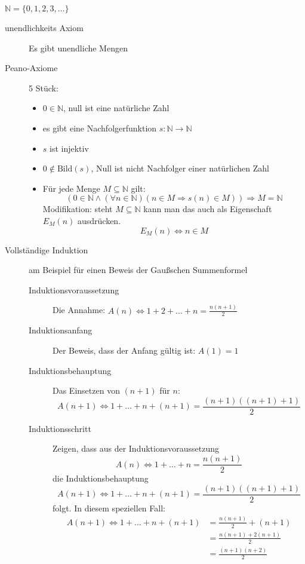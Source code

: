$\mathbb{N} = \lbrace 0, 1, 2, 3, \dots \rbrace$
\begin{description}
    \item[unendlichkeits Axiom] Es gibt unendliche Mengen
    \item[Peano-Axiome] 5 Stück:
    \begin{itemize}
        \item $0 \in \mathbb{N}$, null ist eine natürliche Zahl
        \item es gibt eine Nachfolgerfunktion $s : \mathbb{N} \longrightarrow \mathbb{N}$
        \item $s$ ist injektiv
        \item $0 \not \in \textrm{Bild}(s)$, Null ist nicht Nachfolger einer natürlichen Zahl
        \item Für jede Menge $M \subseteq \mathbb{N}$ gilt:
        \[(0 \in \mathbb{N} \wedge (\forall n \in \mathbb{N})(n \in M \Rightarrow s(n) \in M)) \Rightarrow M = \mathbb{N}\]
        Modifikation: steht $M \subseteq \mathbb{N}$ kann man das auch als Eigenschaft $E_M(n)$ ausdrücken.
        \[E_M(n) \Leftrightarrow n \in M\]
    \end{itemize}
    \item[Vollständige Induktion] am Beispiel für einen Beweis der Gaußschen Summenformel
    \begin{description}
        \item[Induktionsvoraussetzung] Die Annahme: $A(n) \Leftrightarrow 1 + 2 + \dots + n = \frac{n(n+1)}{2}$
        \item[Induktionsanfang] Der Beweis, dass der Anfang gültig ist: $A(1) = 1$
        \item[Induktionsbehauptung] Das Einsetzen von $(n + 1)$ für $n$:
        \[A(n + 1) \Leftrightarrow 1 + \dots + n + (n + 1)= \frac{(n + 1)((n + 1)+1)}{2}\]
        \item[Induktionsschritt] Zeigen, dass aus der Induktionsvoraussetzung
        \[A(n) \Leftrightarrow 1 + \dots + n = \frac{n(n+1)}{2}\]
        die Induktionsbehauptung
        \[A(n + 1) \Leftrightarrow 1 + \dots + n + (n + 1) = \frac{(n + 1)((n + 1)+1)}{2}\]
        folgt.
        In diesem speziellen Fall:
        \begin{align*}
            A(n + 1) \Leftrightarrow 1 + \dots + n + (n + 1) & = \frac{n(n + 1)}{2} + (n + 1)  \\
            & = \frac{n(n + 1) + 2(n + 1)}{2} \\
            & = \frac{(n + 1)(n + 2)}{2}      \\

\end{align*}
\end{description}
\end{description}
